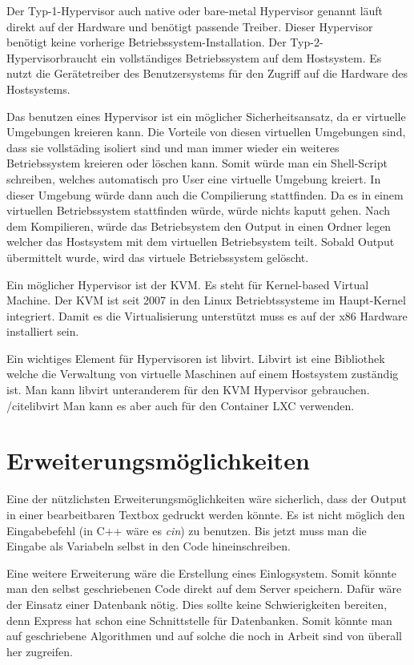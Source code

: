 \documentclass[10pt]{article}
\begin{document}
	Der Typ-1-Hypervisor auch native oder bare-metal Hypervisor genannt läuft direkt auf der Hardware und benötigt passende Treiber. Dieser Hypervisor benötigt keine vorherige Betriebssystem-Installation. 
	Der Typ-2-Hypervisorbraucht ein vollständiges Betriebssystem auf dem Hostsystem. Es nutzt die Gerätetreiber des Benutzersystems für den Zugriff auf die Hardware des Hostsystems. 
	
	Das benutzen eines Hypervisor ist ein möglicher Sicherheitsansatz, da er virtuelle Umgebungen kreieren kann. Die Vorteile von diesen virtuellen Umgebungen sind, dass sie vollstäding isoliert sind und man immer wieder ein weiteres Betriebssystem kreieren oder löschen kann. Somit würde man ein Shell-Script schreiben, welches automatisch pro User eine virtuelle Umgebung kreiert. In dieser Umgebung würde dann auch die Compilierung stattfinden. Da es in einem virtuellen Betriebssystem stattfinden würde, würde nichts kaputt gehen. Nach dem Kompilieren, würde das Betriebsystem den Output in einen Ordner legen welcher das Hostsystem mit dem virtuellen Betriebsystem teilt. Sobald Output übermittelt wurde, wird das virtuele Betriebssystem gelöscht.
	
	Ein möglicher Hypervisor ist der KVM. Es steht für Kernel-based Virtual Machine. Der KVM ist seit 2007 in den Linux Betriebtssysteme im Haupt-Kernel integriert. %
	Damit es die Virtualisierung unterstützt muss es auf der x86 Hardware installiert sein.
	
	Ein wichtiges Element für Hypervisoren ist libvirt. Libvirt ist eine Bibliothek welche die Verwaltung von virtuelle Maschinen auf einem Hostsystem zuständig ist. Man kann libvirt unteranderem für den KVM Hypervisor gebrauchen. /cite{libvirt}  Man kann es aber auch für den Container LXC verwenden.
	

	\pagebreak
	\section{Erweiterungsmöglichkeiten}
	Eine der nützlichsten Erweiterungsmöglichkeiten wäre sicherlich, dass der Output in einer bearbeitbaren Textbox gedruckt werden könnte. Es ist nicht möglich den Eingabebefehl (in C++ wäre es \textit{cin}) zu benutzen. Bis jetzt muss man die Eingabe als Variabeln selbst in den Code hineinschreiben. 
	
	Eine weitere Erweiterung wäre die Erstellung eines Einlogsystem. Somit könnte man den selbst geschriebenen Code direkt auf dem Server speichern. Dafür wäre der Einsatz einer Datenbank nötig. Dies sollte keine Schwierigkeiten bereiten, denn Express hat schon eine Schnittstelle für Datenbanken. Somit könnte man auf geschriebene Algorithmen und auf solche die noch in Arbeit sind von überall her zugreifen. 
	
\end{document}
